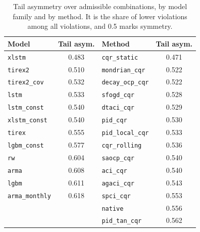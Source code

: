 \begin{table}[t]
\centering
\caption{Tail asymmetry over admissible combinations, by model family and by method. It is the share of lower violations among all violations, and 0.5 marks symmetry.}
\label{tab:app_tail}
\begin{tabular}{lc@{\hskip 2cm}lc}
\toprule
Model & Tail asym. & Method & Tail asym. \\
\midrule
\texttt{xlstm}        & 0.483 & \texttt{cqr\_static}     & 0.471 \\
\texttt{tirex2}       & 0.510 & \texttt{mondrian\_cqr}   & 0.522 \\
\texttt{tirex2\_cov}  & 0.532 & \texttt{decay\_ocp\_cqr} & 0.522 \\
\texttt{lstm}         & 0.533 & \texttt{sfogd\_cqr}      & 0.528 \\
\texttt{lstm\_const}  & 0.540 & \texttt{dtaci\_cqr}      & 0.529 \\
\texttt{xlstm\_const} & 0.540 & \texttt{pid\_cqr}        & 0.530 \\
\texttt{tirex}        & 0.555 & \texttt{pid\_local\_cqr} & 0.533 \\
\texttt{lgbm\_const}  & 0.577 & \texttt{cqr\_rolling}    & 0.536 \\
\texttt{rw}           & 0.604 & \texttt{saocp\_cqr}      & 0.540 \\
\texttt{arma}         & 0.608 & \texttt{aci\_cqr}        & 0.540 \\
\texttt{lgbm}         & 0.611 & \texttt{agaci\_cqr}      & 0.543 \\
\texttt{arma\_monthly}& 0.618 & \texttt{spci\_cqr}       & 0.553 \\
                      &       & \texttt{native}          & 0.556 \\
                      &       & \texttt{pid\_tan\_cqr}   & 0.562 \\
\bottomrule
\end{tabular}
\end{table}

